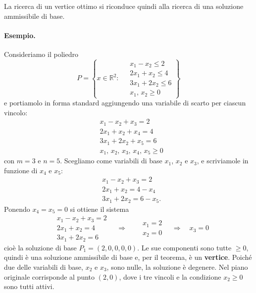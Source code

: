 La ricerca di un vertice ottimo si riconduce quindi alla ricerca di una soluzione ammissibile di base.

\paragraph{Esempio.}
Consideriamo il poliedro
\[
P = \left\{ x \in \mathbb{R}^2 : \;
\begin{aligned}
&x_1 - x_2 \le 2 \\
&2x_1 + x_2 \le 4 \\
&3x_1 + 2x_2 \le 6 \\
&x_1,\, x_2 \ge 0
\end{aligned}
\right\}
\]
e portiamolo in forma standard aggiungendo una variabile di scarto per ciascun vincolo:
\[
\begin{aligned}
&x_1 - x_2 + x_3 = 2 \\
&2x_1 + x_2 + x_4 = 4 \\
&3x_1 + 2x_2 + x_5 = 6 \\
&x_1,\, x_2,\, x_3,\, x_4,\, x_5 \ge 0
\end{aligned}
\]
con $m = 3$ e $n = 5$. Scegliamo come variabili di base $x_1$, $x_2$ e $x_3$, e scriviamole in funzione di $x_4$ e $x_5$:
\[
\begin{aligned}
&x_1 - x_2 + x_3 = 2 \\
&2x_1 + x_2 = 4 - x_4 \\
&3x_1 + 2x_2 = 6 - x_5.
\end{aligned}
\]
Ponendo $x_4 = x_5 = 0$ si ottiene il sistema
\[
\begin{aligned}
&x_1 - x_2 + x_3 = 2 \\
&2x_1 + x_2 = 4 \\
&3x_1 + 2x_2 = 6
\end{aligned}
\quad \Longrightarrow \quad
\begin{aligned}
&x_1 = 2 \\
&x_2 = 0
\end{aligned}
\quad \Longrightarrow \quad x_3 = 0
\]
cioè la soluzione di base $P_1 = (2, 0, 0, 0, 0)$. Le sue componenti sono tutte $\ge 0$, quindi è una soluzione ammissibile di base e, per il teorema, è un \textbf{vertice}. Poiché due delle variabili di base, $x_2$ e $x_3$, sono nulle, la soluzione è degenere. Nel piano originale corrisponde al punto $(2, 0)$, dove i tre vincoli e la condizione $x_2 \ge 0$ sono tutti attivi.

